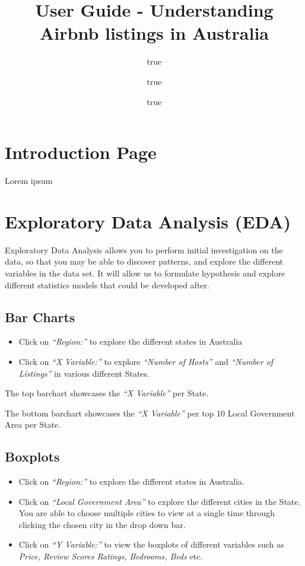\documentclass[
]{article}
\title{User Guide - Understanding Airbnb listings in Australia}
\author{true \and true \and true}
\date{}
\providecommand{\tightlist}{%
  \setlength{\itemsep}{0pt}\setlength{\parskip}{0pt}}
\begin{document}
\maketitle

\hypertarget{introduction-page}{%
\section{Introduction Page}\label{introduction-page}}

Lorem ipsum

\hypertarget{exploratory-data-analysis-eda}{%
\section{Exploratory Data Analysis
(EDA)}\label{exploratory-data-analysis-eda}}

Exploratory Data Analysis allows you to perform initial investigation on
the data, so that you may be able to discover patterns, and explore the
different variables in the data set. It will allow us to formulate
hypothesis and explore different statistics models that could be
developed after.

\hypertarget{bar-charts}{%
\subsection{Bar Charts}\label{bar-charts}}

\begin{itemize}
\tightlist
\item
  Click on \emph{``Region:''} to explore the different states in
  Australia
\item
  Click on \emph{``X Variable:''} to explore \emph{``Number of Hosts''}
  and \emph{``Number of Listings''} in various different States.
\end{itemize}

The top barchart showcases the \emph{``X Variable''} per State.

The bottom barchart showcases the \emph{``X Variable''} per top 10 Local
Government Area per State.

\hypertarget{boxplots}{%
\subsection{Boxplots}\label{boxplots}}

\begin{itemize}
\tightlist
\item
  Click on \emph{``Region:''} to explore the different states in
  Australia.
\item
  Click on \emph{``Local Government Area''} to explore the different
  cities in the State. You are able to choose multiple cities to view at
  a single time through clicking the chosen city in the drop down bar.
\item
  Click on \emph{``Y Variable:''} to view the boxplots of different
  variables such as \emph{Price, Review Scores Ratings, Bedrooms, Beds}
  etc.
\end{itemize}
\end{document}
